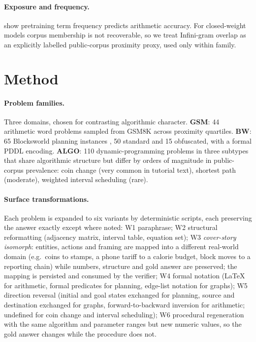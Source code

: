 \documentclass{article}
\begin{document}
\paragraph{Exposure and frequency.} \citet{razeghi2022impact} show pretraining term
frequency predicts arithmetic accuracy. For closed-weight models corpus membership
is not recoverable, so we treat Infini-gram overlap \citep{liu2024infinigram} as an
explicitly labelled public-corpus proximity proxy, used only within family.

\section{Method}

\paragraph{Problem families.} Three domains, chosen for contrasting algorithmic
character. \textbf{GSM}: 44 arithmetic word problems sampled from GSM8K
\citep{cobbe2021training} across proximity quartiles. \textbf{BW}: 65 Blocksworld
planning instances \citep{valmeekam2023planbench}, 50 standard and 15 obfuscated,
with a formal PDDL encoding. \textbf{ALGO}: 110 dynamic-programming problems in
three subtypes that share algorithmic structure but differ by orders of magnitude in
public-corpus prevalence: coin change (very common in tutorial text), shortest path
(moderate), weighted interval scheduling (rare).

\paragraph{Surface transformations.} Each problem is expanded to six variants by
deterministic scripts, each preserving the answer exactly except where noted:
W1 paraphrase; W2 structural reformatting (adjacency matrix, interval table,
equation set); W3 \emph{cover-story isomorph}: entities, actions and framing are mapped into a
different real-world domain (e.g.\ coins to stamps, a phone tariff to a calorie
budget, block moves to a reporting chain) while numbers, structure and gold answer
are preserved; the mapping is persisted and consumed by the verifier; W4 formal notation
(\LaTeX{} for arithmetic, formal predicates for planning, edge-list notation for
graphs); W5 direction reversal (initial and goal states exchanged for planning,
source and destination exchanged for graphs, forward-to-backward inversion for
arithmetic; undefined for coin change and interval scheduling);
W6 procedural regeneration with the same algorithm and parameter ranges but new
numeric values, so the gold answer changes while the procedure does not.
\end{document}
